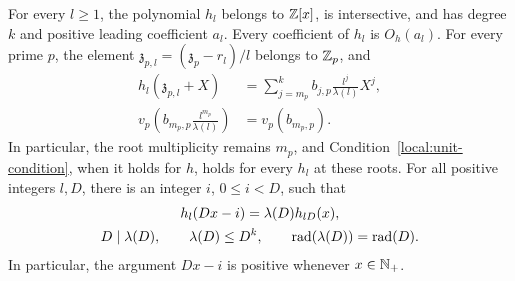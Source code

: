 \begin{lemma}\label{local:family}
For every \(l\ge1\), the polynomial \(h_l\) belongs to \(\mathbb Z[x]\), is
intersective, and has degree \(k\) and positive leading coefficient \(a_l\).
Every coefficient of \(h_l\) is \(O_h(a_l)\). For every prime \(p\), the
element \(\mathfrak z_{p,l}=(\mathfrak z_p-r_l)/l\) belongs to \(\mathbb Z_p\), and
\begin{equation}\label{local:centered-expansion}
 \begin{aligned}
 h_l(\mathfrak z_{p,l}+X)
   &=\sum_{j=m_p}^k b_{j,p}\frac{l^j}{\lambda(l)}X^j,\\
 v_p\!\left(b_{m_p,p}\frac{l^{m_p}}{\lambda(l)}\right)
   &=v_p(b_{m_p,p}).
 \end{aligned}
\end{equation}
In particular, the root multiplicity remains \(m_p\), and
Condition~\eqref{local:unit-condition}, when it holds for \(h\), holds for
every \(h_l\) at these roots. For all positive integers \(l,D\), there is an
integer \(i\), \(0\le i<D\), such that
\begin{equation}\label{eq:1}
 \begin{gathered}
 h_l(Dx-i)=\lambda(D)h_{lD}(x),\\
 D\mid\lambda(D),\qquad \lambda(D)\le D^k,
 \qquad \operatorname{rad}(\lambda(D))=\operatorname{rad}(D).
 \end{gathered}
\end{equation}
In particular, the argument \(Dx-i\) is positive whenever \(x\in\mathbb N_+\).
\end{lemma}


